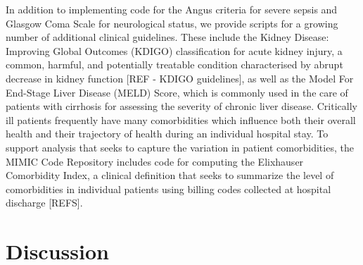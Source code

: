 \documentclass{elsart}
\begin{document}
In addition to implementing code for the Angus criteria for severe sepsis and Glasgow Coma Scale for neurological status, we provide scripts for a growing number of additional clinical guidelines. These include the Kidney Disease: Improving Global Outcomes (KDIGO) classification for acute kidney injury, a common, harmful, and potentially treatable condition characterised by abrupt decrease in kidney function [REF - KDIGO guidelines], as well as the Model For End-Stage Liver Disease (MELD) Score, which is commonly used in the care of patients with cirrhosis for assessing the severity of chronic liver disease. Critically ill patients frequently have many comorbidities which influence both their overall health and their trajectory of health during an individual hospital stay. To support analysis that seeks to capture the variation in patient comorbidities, the MIMIC Code Repository includes code for computing the Elixhauser Comorbidity Index, a clinical definition that seeks to summarize the level of comorbidities in individual patients using billing codes collected at hospital discharge [REFS].


\section{Discussion}





\end{document}
